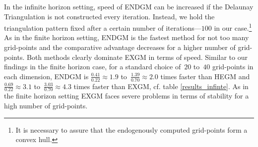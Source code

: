 \documentclass[a4paper,12pt]{article}%
\begin{document}
In the infinite horizon setting, speed of ENDGM can be increased if the
Delaunay Triangulation is not constructed every iteration. Instead, we hold
the triangulation pattern fixed after a certain number of iterations---$100$
in our case.\footnote{It is necessary to assure that the endogenously computed
grid-points form a convex hull.} As in the finite horizon setting, ENDGM is
the fastest method for not too many grid-points and the comparative advantage
decreases for a higher number of grid-points. Both methods clearly dominate
EXGM in terms of speed. Similar to our findings in the finite horizon case,
for a standard choice of~$20$ to~$40$ grid-points in each dimension, ENDGM is
$\frac{0.41}{0.22}\approx1.9$ to~$\frac{1.39}{0.70}\approx2.0$ times faster
than HEGM and $\frac{0.69}{0.22}\approx3.1$ to~$\frac{3.03}{0.70}\approx4.3$
times faster than EXGM, cf. table \ref{results_infinte}. As in the finite
horizon setting EXGM faces severe problems in terms of stability for a high
number of grid-points.%
\end{document}
